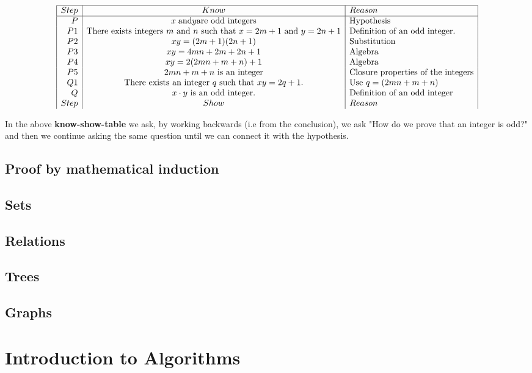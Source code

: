 \documentclass{amsbook}
\begin{document}
\begin{center}
    \[
\begin{array}{|r|c|l|} \hline
Step & Know & Reason\\
\hline
P & x\hspace{.1cm} \text{and} y \text{are odd integers} & \text{Hypothesis}\\
P1 & \text{There exists integers $m$ and $n$ such that $x = 2m + 1$ and $y = 2n + 1$}  & \text{Definition of an odd integer.} \\
P2 & xy = (2m + 1)(2n + 1) & \text{Substitution}\\
P3 & xy = 4mn + 2m + 2n + 1 & \text{Algebra} \\
P4 & xy = 2(2mn + m + n) + 1 & \text{Algebra}\\
P5 & \text{$2mn + m + n$ is an integer} & \text{Closure properties of the integers}\\
Q1 & \text{There exists an integer $q$ such that $xy = 2q + 1.$}  & \text{Use $q = (2mn + m + n)$}\\
Q & \text{$ x \cdot y$ is an odd integer.} & \text{Definition of an odd integer}\\
Step & Show & Reason
\end{array}
\]
\end{center}

In the above \textbf{know-show-table} we ask, by working backwards (i.e from the conclusion), we ask "How do we prove that an integer is odd?" and then we continue asking the same question until we can connect it with the hypothesis.

\section{Proof by mathematical induction}
\section{Sets}
\section{Relations}
\section{Trees}
\section{Graphs}

\chapter{Introduction to Algorithms}
\end{document}
